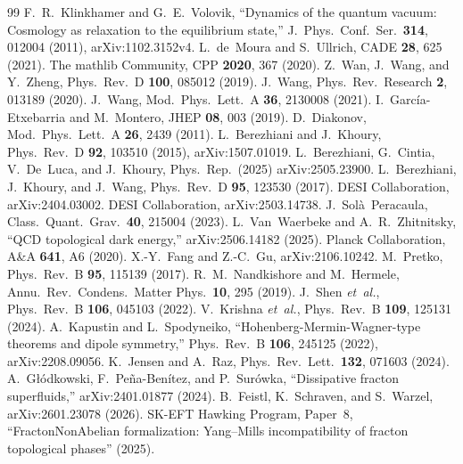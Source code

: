 \documentclass[aps,prd,twocolumn,showpacs,superscriptaddress,nofootinbib]{revtex4-2}
\begin{document}
\begin{thebibliography}{99}
 F.~R.~Klinkhamer and G.~E.~Volovik, ``Dynamics of the quantum vacuum: Cosmology as relaxation to the equilibrium state,'' J.\ Phys.\ Conf.\ Ser.\ \textbf{314}, 012004 (2011), arXiv:1102.3152v4.
 L.~de~Moura and S.~Ullrich, CADE \textbf{28}, 625 (2021).
 The mathlib Community, CPP \textbf{2020}, 367 (2020).
 Z.~Wan, J.~Wang, and Y.~Zheng, Phys.\ Rev.\ D \textbf{100}, 085012 (2019).
 J.~Wang, Phys.\ Rev.\ Research \textbf{2}, 013189 (2020).
 J.~Wang, Mod.\ Phys.\ Lett.\ A \textbf{36}, 2130008 (2021).
 I.~Garc{\'i}a-Etxebarria and M.~Montero, JHEP \textbf{08}, 003 (2019).
 D.~Diakonov, Mod.\ Phys.\ Lett.\ A \textbf{26}, 2439 (2011).
 L.~Berezhiani and J.~Khoury, Phys.\ Rev.\ D \textbf{92}, 103510 (2015), arXiv:1507.01019.
 L.~Berezhiani, G.~Cintia, V.~De~Luca, and J.~Khoury, Phys.\ Rep.\ (2025) arXiv:2505.23900.
 L.~Berezhiani, J.~Khoury, and J.~Wang, Phys.\ Rev.\ D \textbf{95}, 123530 (2017).
 DESI Collaboration, arXiv:2404.03002.
 DESI Collaboration, arXiv:2503.14738.
 J.~Sol{\`a}~Peracaula, Class.\ Quant.\ Grav.\ \textbf{40}, 215004 (2023).
 L.~Van~Waerbeke and A.~R.~Zhitnitsky, ``QCD topological dark energy,'' arXiv:2506.14182 (2025).
 Planck Collaboration, A\&A \textbf{641}, A6 (2020).
 X.-Y.~Fang and Z.-C.~Gu, arXiv:2106.10242.
 M.~Pretko, Phys.\ Rev.\ B \textbf{95}, 115139 (2017).
 R.~M.~Nandkishore and M.~Hermele, Annu.\ Rev.\ Condens.\ Matter Phys.\ \textbf{10}, 295 (2019).
 J.~Shen \textit{et~al.}, Phys.\ Rev.\ B \textbf{106}, 045103 (2022).
 V.~Krishna \textit{et~al.}, Phys.\ Rev.\ B \textbf{109}, 125131 (2024).
 A.~Kapustin and L.~Spodyneiko, ``Hohenberg-Mermin-Wagner-type theorems and dipole symmetry,'' Phys.\ Rev.\ B \textbf{106}, 245125 (2022), arXiv:2208.09056.
 K.~Jensen and A.~Raz, Phys.\ Rev.\ Lett.\ \textbf{132}, 071603 (2024).
 A.~G{\l}{\'o}dkowski, F.~Pe{\~n}a-Ben{\'i}tez, and P.~Sur{\'o}wka, ``Dissipative fracton superfluids,'' arXiv:2401.01877 (2024).
 B.~Feistl, K.~Schraven, and S.~Warzel, arXiv:2601.23078 (2026).
 SK-EFT Hawking Program, Paper~8, ``FractonNonAbelian formalization: Yang--Mills incompatibility of fracton topological phases'' (2025).

\end{thebibliography}
\end{document}
